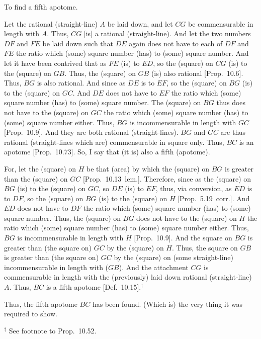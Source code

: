 \begin{Parallel}{}{}
{To find a fifth apotome.

\epsfysize=0.6in
\centerline{}

Let the rational (straight-line) $A$ be laid down, and let
$CG$ be commensurable in length with $A$. Thus, $CG$ [is] a rational
(straight-line). And let the two numbers $DF$ and $FE$ be laid
down such that $DE$ again does not have to each of $DF$ and $FE$
the ratio which (some) square number (has) to (some) square number. 
And let it have been contrived that as $FE$ (is) to $ED$, so the
(square) on $CG$ (is) to the (square) on $GB$. Thus, the (square) on
$GB$ (is) also rational [Prop.~10.6]. 
Thus, $BG$ is also rational.
And since as $DE$ is to $EF$, so the (square) on $BG$ (is) to
the (square) on $GC$. And $DE$ does not have to $EF$ the
ratio which (some) square number (has) to (some) square number.
The (square) on $BG$ thus does not have to the (square) on $GC$
the ratio which (some) square number (has) to (some) square number either.
Thus, $BG$ is incommensurable in length with $GC$ [Prop.~10.9]. And they are both rational (straight-lines). $BG$ and $GC$ are thus rational (straight-lines which are)
commensurable in square only. Thus, $BC$ is an apotome [Prop.~10.73]. So, I say that (it is) also a fifth
(apotome).

For, let the (square) on $H$ be that (area) by which the (square) on $BG$
is greater than the (square) on $GC$ [Prop.~10.13~lem.]. Therefore, since
as the (square) on $BG$ (is) to the (square) on $GC$, so $DE$  (is) to
$EF$, thus, via conversion, as $ED$ is to $DF$, so the (square)
on $BG$ (is) to the (square) on $H$ [Prop.~5.19~corr.]. And $ED$ does not have to
$DF$ the ratio which (some) square number (has) to (some) square number.
Thus, the (square) on $BG$ does not have to the (square) on $H$
the ratio which (some) square number (has) to (some) square number
either. Thus, $BG$ is incommensurable in length with $H$ [Prop.~10.9]. And the square on $BG$ is greater
than (the square on) $GC$ by the (square) on $H$.
Thus, the square on $GB$ is greater
than (the square on) $GC$ by the (square) on (some straight-line)
incommensurable in length with ($GB$). And the attachment $CG$ is
commensurable in length with the (previously) laid down rational (straight-line) $A$. Thus, $BC$ is a fifth apotome [Def.~10.15].$^\dag$

Thus, the fifth apotome $BC$ has been found. (Which is) the very thing it
was required to show.}
\end{Parallel}
{\footnotesize\noindent$^\dag$ See footnote to Prop.~10.52.}

